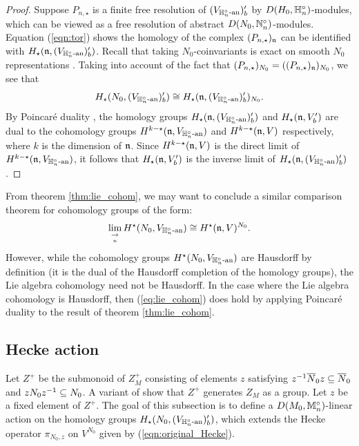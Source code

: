 \documentclass[10pt]{amsart}
\begin{document}
\begin{proof}
Suppose $P_{n,\star}$ is a finite free resolution of $(V_{\mathbb{H}_{n}^{\circ}\textnormal{-an}})^{\prime}_{b}$ by $D(H_{0},\mathbb{H}_{n}^{\circ})$-modules, which can be viewed as a free resolution of abstract $D(N_{0},\mathbb{N}_{n}^{\circ})$-modules. Equation (\ref{eqn:tor}) shows the homology of the complex $(P_{n,\star})_{\mathfrak{n}}$ can be identified with $H_{\star}(\mathfrak{n},(V_{\mathbb{H}_{n}^{\circ}\textnormal{-an}})^{\prime}_{b})$. Recall that taking $N_{0}$-coinvariants is exact on smooth $N_{0}$ representations \cite[Prop 3.2.3]{Casselman}. Taking into account of the fact that $(P_{n,\star})_{N_{0}}=((P_{n,\star})_{\mathfrak{n}})_{N_{0}}$, we see that \begin{equation}
    H_{\star}(N_{0},(V_{\mathbb{H}_{n}^{\circ}\textnormal{-an}})^{\prime}_{b}) \cong H_{\star}(\mathfrak{n},(V_{\mathbb{H}_{n}^{\circ}\textnormal{-an}})^{\prime}_{b})_{N_{0}}. 
\end{equation} By Poincar\'e duality \cite[Thm 6.10]{Knapp}, the homology groups $H_{\star}(\mathfrak{n},(V_{\mathbb{H}_{n}^{\circ}\textnormal{-an}})^{\prime}_{b})$ and $H_{\star}(\mathfrak{n},V^\prime_b)$ are dual to the cohomology groups $H^{k-\star}(\mathfrak{n},V_{\mathbb{H}_n^\circ\textnormal{-an}})$ and $H^{k-\star}(\mathfrak{n},V)$ respectively, where $k$ is the dimension of $\mathfrak{n}$. Since $H^{k-\star}(\mathfrak{n},V)$ is the direct limit of $H^{k-\star}(\mathfrak{n},V_{\mathbb{H}_n^\circ\textnormal{-an}})$, it follows that $H_{\star}(\mathfrak{n},V^\prime_b)$ is the inverse limit of $H_{\star}(\mathfrak{n},(V_{\mathbb{H}_{n}^{\circ}\textnormal{-an}})^{\prime}_{b})$. 
\end{proof}

\begin{remark}\label{rmk:lie_cohom}
From theorem \ref{thm:lie_cohom}, we may want to conclude a similar comparison theorem for cohomology groups of the form: 
\begin{equation}\label{eq:lie_cohom}
    \underset{\underset{n}{\rightarrow}}{\lim}\,H^{\star}(N_{0},V_{\mathbb{H}_{n}^{\circ}\textnormal{-an}}) \cong H^{\star}(\mathfrak{n},V)^{N_{0}}.
\end{equation}
However, while the cohomology groups $H^{\star}(N_{0},V_{\mathbb{H}_{n}^{\circ}\textnormal{-an}})$ are Hausdorff by definition (it is the dual of the Hausdorff completion of the homology groups), the Lie algebra cohomology need not be Hausdorff. In the case where the Lie algebra cohomology is Hausdorff, then (\ref{eq:lie_cohom}) does hold by applying Poincar\'e duality to the result of theorem \ref{thm:lie_cohom}. 
\end{remark}



\subsection{Hecke action}\label{sec:Hecke}
Let $Z^{+}$ be the submonoid of $Z_{M}^{+}$ consisting of elements $z$ satisfying $z^{-1}\overline{N}_{0}z\subseteq \overline{N}_{0}$ and $zN_{0}z^{-1}\subseteq N_{0}$. A variant of \cite[Prop. 3.3.2 (i)]{Jacquet1} show that $Z^{+}$ generates $Z_{M}$ as a group. Let $z$ be a fixed element of $Z^{+}$. The goal of this subsection is to define a $D(M_{0},\mathbb{M}_{n}^{\circ})$-linear action on the homology groups $H_{\star}(N_{0},(V_{\mathbb{H}_{n}^{\circ}\textnormal{-an}})^{\prime}_{b})$, which extends the Hecke operator $\pi_{N_{0},z}$ on $V^{N_{0}}$ given by (\ref{eqn:original_Hecke}).
\end{document}

